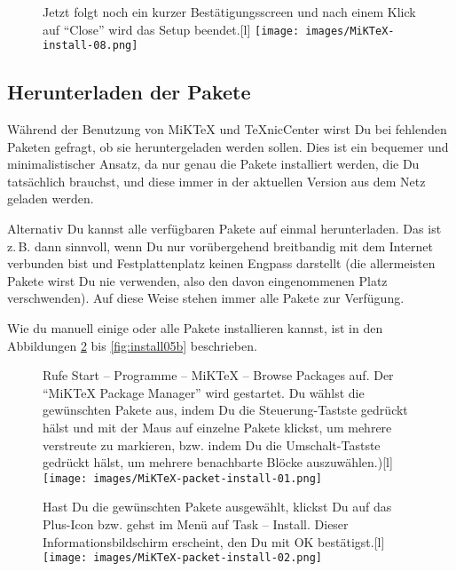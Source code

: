 \begin{figure}[th]
	\begin{captionbeside}{Jetzt folgt noch ein kurzer Bestätigungsscreen und nach einem Klick auf \enquote{Close} wird das Setup beendet.}[l]
		\texttt{[image: images/MiKTeX-install-08.png]}
	\end{captionbeside}
	\label{fig:install08}
\end{figure}

\clearpage %

\subsection{Herunterladen der Pakete}
\label{subsec:instpakete}

Während der Benutzung von MiKTeX und TeXnicCenter wirst Du bei fehlenden Paketen gefragt, ob sie heruntergeladen werden sollen. Dies ist ein bequemer und minimalistischer Ansatz, da nur genau die Pakete installiert werden, die Du tatsächlich brauchst, und diese immer in der aktuellen Version aus dem Netz geladen werden. 

Alternativ Du kannst alle verfügbaren Pakete auf einmal herunterladen. Das ist z.\,B. dann sinnvoll, wenn Du nur vorübergehend breitbandig mit dem Internet verbunden bist und Festplattenplatz keinen Engpass darstellt (die allermeisten Pakete wirst Du nie verwenden, also den davon eingenommenen Platz verschwenden). Auf diese Weise stehen immer alle Pakete zur Verfügung.

Wie du manuell einige oder alle Pakete installieren kannst, ist in den Abbildungen \ref{fig:install10} bis \ref{fig:install05b} beschrieben. 

\begin{figure}[hb]
	\begin{captionbeside}{Rufe Start -- Programme -- MiKTeX -- Browse Packages auf. Der \enquote{MiKTeX Package Manager} wird gestartet. Du wählst die gewünschten Pakete aus, indem Du die Steuerung-Tastste gedrückt hälst und mit der Maus auf einzelne Pakete klickst, um mehrere verstreute zu markieren, bzw. indem Du die Umschalt-Tastste gedrückt hälst, um mehrere benachbarte Blöcke auszuwählen.)}[l]
		\texttt{[image: images/MiKTeX-packet-install-01.png]}
	\end{captionbeside}
	\label{fig:install10}
\end{figure}

\begin{figure}[hb]
	\begin{captionbeside}{Hast Du die gewünschten Pakete ausgewählt, klickst Du auf das Plus-Icon bzw. gehst im Menü auf Task -- Install. Dieser Informationsbildschirm erscheint, den Du mit OK bestätigst.}[l]
		\texttt{[image: images/MiKTeX-packet-install-02.png]}
	\end{captionbeside}
	\label{fig:install03b}
\end{figure}

